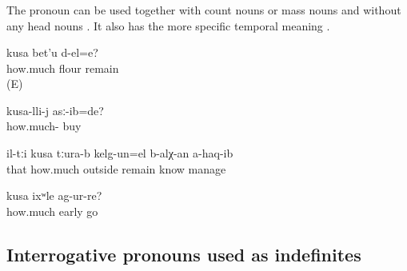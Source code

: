 \subsubsection{ }
\label{sssec:kusa how much how many}

The pronoun  can be used together with count nouns or mass nouns  and without any head nouns . It also has the more specific temporal meaning  .
%
\begin{exe}

	\ex	\label{ex:How much flour remained?}
	\gll	kusa	bet'u	d-el=e?\\
		how.much	flour	remain\\
	\glt	{} (E)

	\ex	\label{ex:For how much did you buy it}
	\gll	kusa-lli-j	asː-ib=de?\\
		how.much-	buy\\
	\glt	{}
	
	\ex	\label{ex:No one is able to know for how long they were away}
	\gll	il-tːi	kusa	tːura-b	kelg-un=el	b-alχ-an	a-haq-ib\\
		that	how.much	outside	remain	know	manage\\
	\glt	{}

	\ex	\label{ex:How (much) early did he go}
	\gll	kusa	ixʷle	ag-ur-re?\\
		how.much	early	go\\
	\glt	{}
\end{exe}



\subsection{Interrogative pronouns used as indefinites}
\label{ssec:Interrogative pronouns as indefinites}

